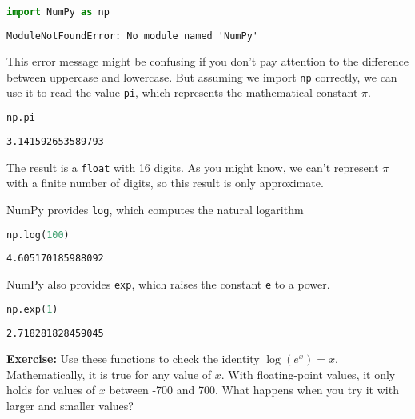 \begin{lstlisting}[language=Python,style=source]
%%expect ModuleNotFoundError

import NumPy as np
\end{lstlisting}

\begin{lstlisting}[style=output]
ModuleNotFoundError: No module named 'NumPy'
\end{lstlisting}

This error message might be confusing if you don't pay attention to the
difference between uppercase and lowercase. But assuming we import
\passthrough{\lstinline!np!} correctly, we can use it to read the value
\passthrough{\lstinline!pi!}, which represents the mathematical constant
\(\pi\).

\begin{lstlisting}[language=Python,style=source]
np.pi
\end{lstlisting}

\begin{lstlisting}[style=output]
3.141592653589793
\end{lstlisting}

The result is a \passthrough{\lstinline!float!} with 16 digits. As you
might know, we can't represent \(\pi\) with a finite number of digits,
so this result is only approximate.

NumPy provides \passthrough{\lstinline!log!}, which computes the natural
logarithm

\begin{lstlisting}[language=Python,style=source]
np.log(100)
\end{lstlisting}

\begin{lstlisting}[style=output]
4.605170185988092
\end{lstlisting}

NumPy also provides \passthrough{\lstinline!exp!}, which raises the
constant \passthrough{\lstinline!e!} to a power.

\begin{lstlisting}[language=Python,style=source]
np.exp(1)
\end{lstlisting}

\begin{lstlisting}[style=output]
2.718281828459045
\end{lstlisting}

\textbf{Exercise:} Use these functions to check the identity
\(\log(e^x) = x\). Mathematically, it is true for any value of \(x\).
With floating-point values, it only holds for values of \(x\) between
-700 and 700. What happens when you try it with larger and smaller
values?


